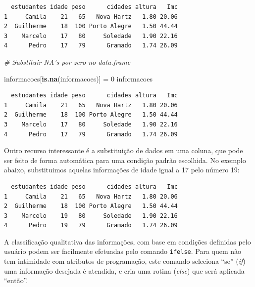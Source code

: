 \documentclass[12pt,brazil,oneside]{book}
\newenvironment{Shaded}{\begin{snugshade}}{\end{snugshade}}
\newcommand{\CommentTok}[1]{\textcolor[rgb]{0.56,0.35,0.01}{\textit{#1}}}
\newcommand{\DecValTok}[1]{\textcolor[rgb]{0.00,0.00,0.81}{#1}}
\newcommand{\KeywordTok}[1]{\textcolor[rgb]{0.13,0.29,0.53}{\textbf{#1}}}
\newcommand{\NormalTok}[1]{#1}
\newcommand{\OperatorTok}[1]{\textcolor[rgb]{0.81,0.36,0.00}{\textbf{#1}}}
\newcommand{\StringTok}[1]{\textcolor[rgb]{0.31,0.60,0.02}{#1}}
\begin{document}
\begin{verbatim}
  estudantes idade peso      cidades altura   Imc
1     Camila    21   65   Nova Hartz   1.80 20.06
2  Guilherme    18  100 Porto Alegre   1.50 44.44
3    Marcelo    17   80     Soledade   1.90 22.16
4      Pedro    17   79      Gramado   1.74 26.09
\end{verbatim}

\begin{Shaded}
\begin{Highlighting}[]
\CommentTok{# Substituir NA's por zero no data.frame}

\NormalTok{informacoes[}\KeywordTok{is.na}\NormalTok{(informacoes)] =}\StringTok{ }\DecValTok{0}
\NormalTok{informacoes}
\end{Highlighting}
\end{Shaded}

\begin{verbatim}
  estudantes idade peso      cidades altura   Imc
1     Camila    21   65   Nova Hartz   1.80 20.06
2  Guilherme    18  100 Porto Alegre   1.50 44.44
3    Marcelo    17   80     Soledade   1.90 22.16
4      Pedro    17   79      Gramado   1.74 26.09
\end{verbatim}

Outro recurso interessante é a substituição de dados em uma coluna, que pode ser feito de forma automática para uma condição padrão escolhida. No exemplo abaixo, substituimos aquelas informações de idade igual a 17 pelo número 19:

\begin{Shaded}
\end{Shaded}

\begin{verbatim}
  estudantes idade peso      cidades altura   Imc
1     Camila    21   65   Nova Hartz   1.80 20.06
2  Guilherme    18  100 Porto Alegre   1.50 44.44
3    Marcelo    19   80     Soledade   1.90 22.16
4      Pedro    19   79      Gramado   1.74 26.09
\end{verbatim}

A classificação qualitativa das informações, com base em condições definidas pelo usuário podem ser facilmente efetuadas pelo comando \texttt{ifelse}. Para quem não tem intimidade com atributos de programação, este comando seleciona ``se'' (\emph{if}) uma informação desejada é atendida, e cria uma rotina (\emph{else}) que será aplicada ``então''.
\end{document}
